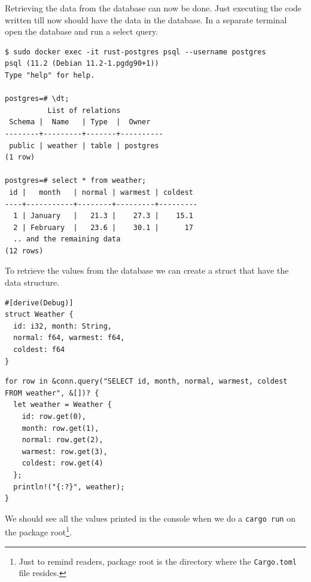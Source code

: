 \documentclass{book}
\begin{document}
Retrieving the data from the database can now be done. Just executing the code written till now should have the data in the database. In a separate terminal open the database and run a select query.

\begin{lstlisting}[caption={bash},basicstyle=\small]
$ sudo docker exec -it rust-postgres psql --username postgres
psql (11.2 (Debian 11.2-1.pgdg90+1))
Type "help" for help.

postgres=# \dt;
          List of relations
 Schema |  Name   | Type  |  Owner
--------+---------+-------+----------
 public | weather | table | postgres
(1 row)

postgres=# select * from weather;
 id |   month   | normal | warmest | coldest
----+-----------+--------+---------+---------
  1 | January   |   21.3 |    27.3 |    15.1
  2 | February  |   23.6 |    30.1 |      17
  .. and the remaining data
(12 rows)
\end{lstlisting}

To retrieve the values from the database we can create a struct that have the data structure.

\begin{lstlisting}[caption={chapter4\\/working\_with\_data\\/databases\\/src\\/main\\.rs},basicstyle=\small]
#[derive(Debug)]
struct Weather {
  id: i32, month: String,
  normal: f64, warmest: f64,
  coldest: f64
}
\end{lstlisting}

\begin{lstlisting}[caption={chapter4\\/working\_with\_data\\/databases\\/src\\/main\\.rs},basicstyle=\small]
for row in &conn.query("SELECT id, month, normal, warmest, coldest FROM weather", &[])? {
  let weather = Weather {
    id: row.get(0),
    month: row.get(1),
    normal: row.get(2),
    warmest: row.get(3),
    coldest: row.get(4)
  };
  println!("{:?}", weather);
}
\end{lstlisting}

We should see all the values printed in the console when we do a \lstinline{cargo run} on the package root\footnote{Just to remind readers, package root is the directory where the \lstinline{Cargo.toml} file resides.}.
\end{document}
